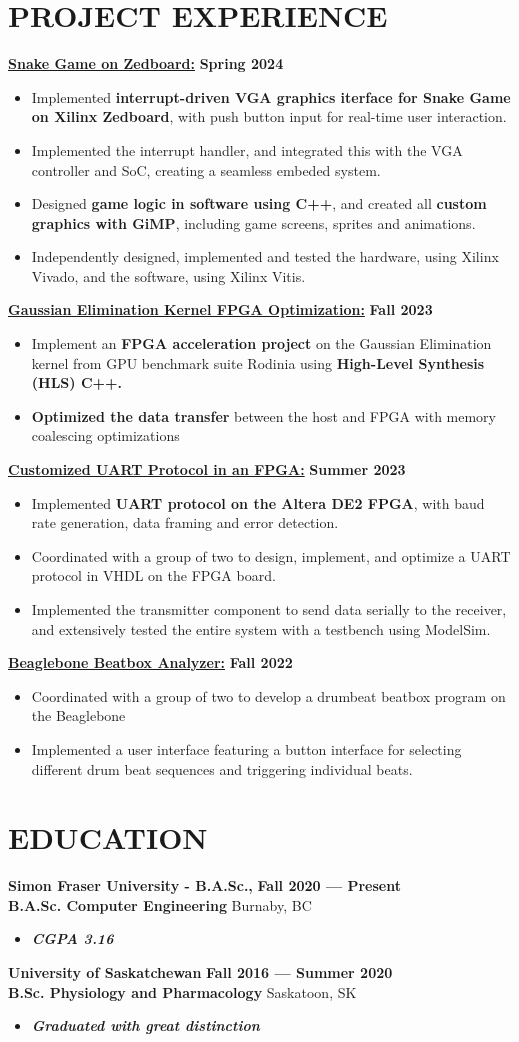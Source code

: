 \documentclass[letterpaper,11pt]{article}
\newcommand{\Item} [1] {
    \item\small{{#1 \vspace{-2pt}}}
}
\newcommand{\school} [6] {
    {\textbf{#1} \hfill \textbf{#5 --- #6}\\ \textbf{#3} \hfill #2\\ \begin{itemize}[topsep=0pt,itemsep=-2pt]\item{\textbf{\emph{#4}}}\end{itemize}}
}
\newcommand{\resumeItemListStart} [0] {
    \vspace{2pt}
    \begin{itemize}[topsep=0pt,itemsep=-2pt]
}
\newcommand{\resumeItemListEnd} [0] {
    \end{itemize}
    \vspace{5pt}
}
\begin{document}
    \section{PROJECT EXPERIENCE}
    {{\color{colorValue}} \underline{\textbf{Snake Game on Zedboard:}}} \hfill \textbf{Spring 2024}
    \resumeItemListStart{}
        \Item{Implemented \textbf{interrupt-driven VGA graphics iterface for Snake Game on Xilinx Zedboard}, with push button input for real-time user interaction.}
        \Item{Implemented the interrupt handler, and integrated this with the VGA controller and SoC, creating a seamless embeded system.}
        \Item{Designed \textbf{game logic in software using C++}, and created all \textbf{custom graphics with GiMP}, including game screens, sprites and animations.}
        \Item{Independently designed, implemented and tested the hardware, using Xilinx Vivado, and the software, using Xilinx Vitis.}
    \resumeItemListEnd{}
    {{\color{colorValue}} \underline{\textbf{Gaussian Elimination Kernel FPGA Optimization:}}} \hfill \textbf{Fall 2023}
    \resumeItemListStart{}
        \Item{Implement an \textbf{FPGA acceleration project} on the Gaussian Elimination kernel from GPU benchmark suite Rodinia using \textbf{High-Level Synthesis (HLS) C++.}}
        \Item{\textbf{Optimized the data transfer} between the host and FPGA with memory coalescing optimizations}
    \resumeItemListEnd{}
    {{\color{colorValue}} \underline{\textbf{Customized UART Protocol in an FPGA:}}} \hfill \textbf{Summer 2023}
    \resumeItemListStart{}
        \Item{Implemented \textbf{UART protocol on the Altera DE2 FPGA}, with baud rate generation, data framing and error detection.}
        \Item{Coordinated with a group of two to design, implement, and optimize a UART protocol in VHDL on the FPGA board.}
        \Item{Implemented the transmitter component to send data serially to the receiver, and extensively tested the entire system with a testbench using ModelSim.}
    \resumeItemListEnd{}
    {{\color{colorValue}} \underline{\textbf{Beaglebone Beatbox Analyzer:}}} \hfill \textbf{Fall 2022}
    \resumeItemListStart{}
        \Item{Coordinated with a group of two to develop a drumbeat beatbox program on the Beaglebone}
        \Item{Implemented a user interface featuring a button interface for selecting different drum beat sequences and triggering individual beats.}
    \resumeItemListEnd{}

    \section{EDUCATION}
    \school{Simon Fraser University - B.A.Sc.,}{Burnaby, BC}{B.A.Sc. Computer Engineering}{CGPA 3.16}{Fall 2020}{Present}
    \school{University of Saskatchewan}{Saskatoon, SK}{B.Sc. Physiology and Pharmacology}{Graduated with great distinction}{Fall 2016}{Summer 2020}
\end{document}
